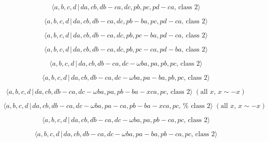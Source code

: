 \documentclass[10pt]{article}
\begin{document}
\begin{equation}
\langle a,b,c,d\,|\,da,cb,db-ca,dc,pb,pc,pd-ca,\,\text{class }2\rangle 
\tag{7.3058}
\end{equation}

\begin{equation}
\langle a,b,c,d\,|\,da,cb,db-ca,dc,pb-ba,pc,pd-ca,\,\text{class }2\rangle 
\tag{7.3059}
\end{equation}

\begin{equation}
\langle a,b,c,d\,|\,da,cb,db-ca,dc,pb,pc-ba,pd-ca,\,\text{class }2\rangle 
\tag{7.3060}
\end{equation}

\begin{equation}
\langle a,b,c,d\,|\,da,cb,db-ca,dc,pb,pc-ca,pd-ba,\,\text{class }2\rangle 
\tag{7.3061}
\end{equation}

\begin{equation}
\langle a,b,c,d\,|\,da,cb,db-ca,dc-\omega ba,pa,pb,pc,\,\text{class }2\rangle
\tag{7.3062}
\end{equation}

\begin{equation}
\langle a,b,c,d\,|\,da,cb,db-ca,dc-\omega ba,pa-ba,pb,pc,\,\text{class }%
2\rangle  \tag{7.3063}
\end{equation}

\begin{equation}
\langle a,b,c,d\,|\,da,cb,db-ca,dc-\omega ba,pa,pb-ba-xca,pc,\,\text{class }%
2\rangle \;(\text{all }x,\,x\sim -x)  \tag{7.3064}
\end{equation}

\begin{equation}
\langle a,b,c,d\,|\,da,cb,db-ca,dc-\omega ba,pa-ca,pb-ba-xca,pc,\,\text{%
class }2\rangle \;(\text{all }x,\,x\sim -x)  \tag{7.3065}
\end{equation}

\begin{equation}
\langle a,b,c,d\,|\,da,cb,db-ca,dc-\omega ba,pa,pb-ca,pc,\,\text{class }%
2\rangle  \tag{7.3066}
\end{equation}

\begin{equation}
\langle a,b,c,d\,|\,da,cb,db-ca,dc-\omega ba,pa-ba,pb-ca,pc,\,\text{class }%
2\rangle  \tag{7.3067}
\end{equation}
\end{document}
